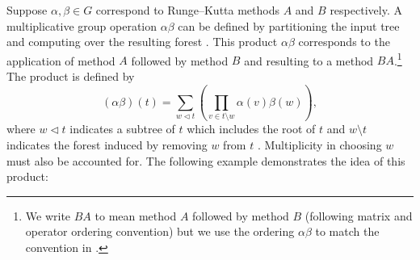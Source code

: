 

Suppose $\alpha, \beta \in G$ correspond to Runge--Kutta methods $A$ and $B$ respectively.
A multiplicative group operation $\alpha\beta$ can be defined
by partitioning the input tree and
computing over the resulting forest \cite{Butcher2008_book}.
This product $\alpha\beta$ corresponds to the application
of method $A$ followed by method $B$ and resulting to a method
$BA$.\footnote{We write $BA$ to mean method $A$ followed by method $B$
  (following matrix and operator ordering convention) but we use the
  ordering $\alpha\beta$ to match the convention in
  \cite{Butcher2008_book}.}
The product is defined by
\begin{equation}\label{eq:Group_operation}
  (\alpha\beta)(t) = \sum_{w \lhd t} \left(\prod_{v \in t \setminus w} \alpha(v)\beta(w)\right),
\end{equation}
where $w \lhd t$ indicates a subtree of $t$ which includes the
root of $t$ and $w \setminus t$ indicates the forest induced
by removing $w$ from $t$ \cite{Butcher2008_book}.
Multiplicity in choosing $w$ must also be accounted for.
The following example demonstrates the idea of this product:


